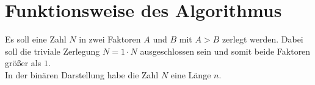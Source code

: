 \section{Funktionsweise des Algorithmus}
Es soll eine Zahl $N$ in zwei Faktoren $A$ und $B$ mit $A>B$ zerlegt werden. Dabei soll die triviale Zerlegung $N=1\cdot N$ ausgeschlossen sein und somit beide Faktoren größer als $1$. \\
In der binären Darstellung habe die Zahl $N$ eine Länge $n$.
